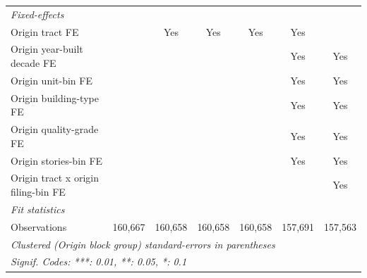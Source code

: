 \begin{tabular}{lcccccc}
   \midrule
   \emph{Fixed-effects}\\
   Origin tract FE                                 &                        & Yes      & Yes      & Yes            & Yes            & \\  
   Origin year-built decade FE                     &                        &          &          &                & Yes            & Yes\\  
   Origin unit-bin FE                              &                        &          &          &                & Yes            & Yes\\  
   Origin building-type FE                         &                        &          &          &                & Yes            & Yes\\  
   Origin quality-grade FE                         &                        &          &          &                & Yes            & Yes\\  
   Origin stories-bin FE                           &                        &          &          &                & Yes            & Yes\\  
   Origin tract x origin filing-bin FE             &                        &          &          &                &                & Yes\\  
   \midrule
   \emph{Fit statistics}\\
   Observations                                    & 160,667                & 160,658  & 160,658  & 160,658        & 157,691        & 157,563\\  
   \midrule \midrule
   \multicolumn{7}{l}{\emph{Clustered (Origin block group) standard-errors in parentheses}}\\
   \multicolumn{7}{l}{\emph{Signif. Codes: ***: 0.01, **: 0.05, *: 0.1}}\\
\end{tabular}
\par\endgroup
